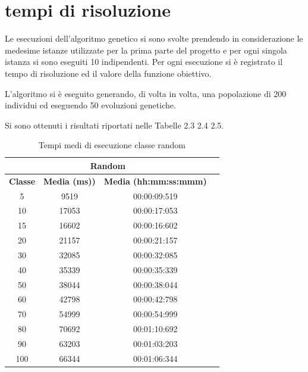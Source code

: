 %
%
\section[Tempi di risoluzione]{tempi di risoluzione}
\label{pt2:time}
Le esecuzioni dell'algoritmo genetico si sono svolte prendendo in considerazione le medesime istanze utilizzate per la prima parte del progetto e per ogni singola istanza si sono eseguiti 10  indipendenti. Per ogni esecuzione si è registrato il tempo di risoluzione ed il valore della funzione obiettivo.

L'algoritmo si è eseguito generando, di volta in volta, una popolazione di 200 individui ed eseguendo 50 evoluzioni genetiche.

Si sono ottenuti i risultati riportati nelle Tabelle 2.3 2.4 2.5.

\begin{table}[htbp]
\centering
\label{pt1:time:tabular_random}
\begin{tabular}{|c|c|c|c|}
\hline
\multicolumn{3}{|c|}{Random}\\
\hline
\textbf{Classe} & \textbf{Media (ms))} & \textbf{Media (hh:mm:ss:mmm)}\\
\hline
5   &   9519 & 00:00:09:519\\
\hline
10  &  17053 & 00:00:17:053\\
\hline
15  &  16602 & 00:00:16:602\\
\hline
20  &  21157 & 00:00:21:157\\
\hline
30  &  32085 & 00:00:32:085\\
\hline
40  &  35339 & 00:00:35:339\\
\hline
50  &  38044 & 00:00:38:044\\
\hline
60  &  42798 & 00:00:42:798\\
\hline
70  &  54999 & 00:00:54:999\\
\hline
80  &  70692 & 00:01:10:692\\
\hline
90  &  63203 & 00:01:03:203\\
\hline
100 &  66344 & 00:01:06:344\\
\hline
\end{tabular}
\caption{Tempi medi di esecuzione classe random}
\end{table}

